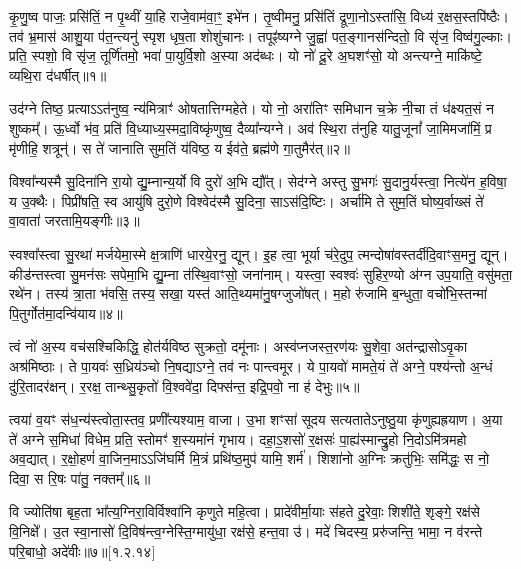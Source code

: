 कृ॒णु॒ष्व पाजः॒ प्रसि॑तिं॒ न पृ॒थ्वीं या॒हि राजे॒वाम॑वा॒ꣳ॒ इभे॑न। तृ॒ष्वीमनु॒ प्रसि॑तिं द्रूणा॒नोऽस्ता॑सि॒ विध्य॑ र॒क्षस॒स्तपि॑ष्ठैः। तव॑ भ्र॒मास॑ आशु॒या प॑त॒न्त्यनु॑ स्पृश धृष॒ता शोशु॑चानः। तपूꣴ॑ष्यग्ने जु॒ह्वा॑ पत॒ङ्गानस॑न्दितो॒ वि सृ॑ज॒ विष्व॑गु॒ल्काः। प्रति॒ स्पशो॒ वि सृ॑ज॒ तूर्णि॑तमो॒ भवा॑ पा॒युर्वि॒शो अ॒स्या अद॑ब्धः। यो नो॑ दू॒रे अ॒घशꣳ॑सो॒  यो अन्त्यग्ने॒ माकि॑ष्टे॒ व्यथि॒रा द॑धर्षीत्॥१॥

उद॑ग्ने तिष्ठ॒ प्रत्याऽऽत॑नुष्व॒ न्य॑मित्राꣳ॑ ओषतात्तिग्महेते। यो नो॒ अरा॑तिꣳ समिधान च॒क्रे नी॒चा तं ध॑क्ष्यत॒सं न शुष्कम्᳚। ऊ॒र्ध्वो भ॑व॒ प्रति॑ वि॒ध्याध्य॒स्मदा॒विष्कृ॑णुष्व॒ दैव्या᳚न्यग्ने। अव॑ स्थि॒रा त॑नुहि यातु॒जूनां᳚ जा॒मिमजा॑मिं॒ प्र मृ॑णीहि॒ शत्रून्॑। स ते॑ जानाति सुम॒तिं य॑विष्ठ॒ य ईव॑ते॒ ब्रह्म॑णे गा॒तुमैर॑त्॥२॥

विश्वा᳚न्यस्मै सु॒दिना॑नि रा॒यो द्यु॒म्नान्य॒र्यो वि दुरो॑ अ॒भि द्यौ᳚त्। सेद॑ग्ने अस्तु सु॒भगः॑ सु॒दानु॒र्यस्त्वा॒ नित्ये॑न ह॒विषा॒ य उ॒क्थैः। पिप्री॑षति॒ स्व आयु॑षि दुरो॒णे विश्वेद॑स्मै सु॒दिना॒ साऽस॑दि॒ष्टिः। अर्चा॑मि ते सुम॒तिं घोष्य॒र्वाख्सं ते॑ वा॒वाता॑ जरतामि॒यङ्गीः॥३॥
 
स्वश्वा᳚स्त्वा सु॒रथा॑ मर्जयेमा॒स्मे क्ष॒त्राणि॑ धारये॒रनु॒ द्यून्। इ॒ह त्वा॒ भूर्या च॑रे॒दुप॒ त्मन्दोषा॑\-वस्तर्दीदि॒वाꣳ\-स॒मनु॒ द्यून्। कीड॑न्तस्त्वा सु॒मन॑सः सपेमा॒भि द्यु॒म्ना त॑स्थि॒वाꣳसो॒ जना॑नाम्। यस्त्वा॒ स्वश्वः॑ सुहिर॒ण्यो अ॑ग्न उप॒याति॒ वसु॑मता॒ रथे॑न। तस्य॑ त्रा॒ता भ॑वसि॒ तस्य॒ सखा॒ यस्त॑ आति॒थ्यमा॑नु॒षग्जुजो॑षत्। म॒हो रु॑जामि ब॒न्धुता॒ वचो॑भि॒स्तन्मा॑ पि॒तुर्गोत॑मा॒दन्वि॑याय॥४॥

त्वं नो॑ अ॒स्य वच॑सश्चिकिद्धि॒ होत॑र्यविष्ठ सुक्रतो॒ दमू॑नाः। अस्व॑प्नजस्त॒रण॑यः सु॒शेवा॒ अत॑न्द्रासोऽवृ॒का अश्र॑मिष्ठाः। ते पा॒यवः॑ स॒ध्रिय॑ञ्चो नि॒षद्याऽग्ने॒ तव॑ नः पान्त्वमूर। ये पा॒यवो॑ मामते॒यं ते॑ अग्ने॒ पश्य॑न्तो अ॒न्धं दु॑रि॒तादर॑क्षन्। र॒रक्ष॒ तान्थ्सु॒कृतो॑ वि॒श्ववे॑दा॒ दिफ्स॑न्त॒ इद्रि॒पवो॒ ना ह॑ देभुः॥५॥
 
त्वया॑ व॒यꣳ स॑ध॒न्य॑स्त्वोता॒स्तव॒ प्रणी᳚त्यश्याम॒ वाजा\sn{}। उ॒भा शꣳसा॑ सूदय सत्यतातेऽनुष्ठु॒या कृ॑णुह्यह्रयाण। अ॒या ते॑ अग्ने स॒मिधा॑ विधेम॒ प्रति॒ स्तोमꣳ॑ श॒स्यमा॑नं गृभाय। दहा॒ऽ॒शसो॑ र॒क्षसः॑ पा॒ह्य॑स्मान्द्रु॒हो नि॒दोऽमि॑त्रमहो अव॒द्यात्। र॒क्षो॒हणं॑ वा॒जिन॒माऽऽजि॑घर्मि मि॒त्रं प्रथि॑ष्ठ॒मुप॑ यामि॒ शर्म॑। शिशा॑नो अ॒ग्निः क्रतु॑भिः॒ समि॑द्धः॒ स नो॒ दिवा॒ स रि॒षः पा॑तु॒ नक्तम्᳚॥६॥

 वि ज्योति॑षा बृह॒ता भा᳚त्य॒ग्निरा॒विर्विश्वा॑नि कृणुते महि॒त्वा। प्रादे॑वीर्मा॒याः स॑हते दु॒रेवाः॒ शिशी॑ते॒ शृङ्गे॒ रक्ष॑से वि॒निक्षे᳚। उ॒त स्वा॒नासो॑ दि॒विष॑न्त्व॒ग्नेस्ति॒ग्मायु॑धा॒ रक्ष॑से॒ हन्त॒वा उ॑। मदे॑ चिदस्य॒ प्ररु॑जन्ति॒ भामा॒ न व॑रन्ते परि॒बाधो॒ अदे॑वीः॥७॥[१.२.१४]


